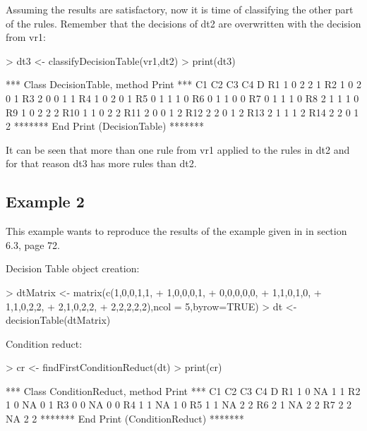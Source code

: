 \documentclass[a4paper]{article}
\begin{document}
Assuming the results are satisfactory, now it is time of classifying the other part of the rules. Remember that the decisions of dt2 are overwritten with the decision from vr1:

\begin{Schunk}
\begin{Sinput}
> dt3 <- classifyDecisionTable(vr1,dt2)
> print(dt3)
\end{Sinput}
\begin{Soutput}
*** Class DecisionTable, method Print *** 
    C1 C2 C3 C4 D
R1  1  0  2  2  1
R2  1  0  2  0  1
R3  2  0  0  1  1
R4  1  0  2  0  1
R5  0  1  1  1  0
R6  0  1  1  0  0
R7  0  1  1  1  0
R8  2  1  1  1  0
R9  1  0  2  2  2
R10 1  1  0  2  2
R11 2  0  0  1  2
R12 2  2  0  1  2
R13 2  1  1  1  2
R14 2  2  0  1  2
******* End Print (DecisionTable) ******* 
\end{Soutput}
\end{Schunk}

It can be seen that more than one rule from vr1 applied to the rules in dt2 and for that reason dt3 has more rules than dt2.



\subsection{Example 2}
This example wants to reproduce the results of the example given in \cite{pawlak} in section 6.3, page 72.

Decision Table object creation:
\begin{Schunk}
\begin{Sinput}
> dtMatrix <- matrix(c(1,0,0,1,1,
+ 1,0,0,0,1,
+ 0,0,0,0,0,
+ 1,1,0,1,0,
+ 1,1,0,2,2,
+ 2,1,0,2,2,
+ 2,2,2,2,2),ncol = 5,byrow=TRUE)
> dt <- decisionTable(dtMatrix)
\end{Sinput}
\end{Schunk}

Condition reduct:
\begin{Schunk}
\begin{Sinput}
> cr <- findFirstConditionReduct(dt)
> print(cr)
\end{Sinput}
\begin{Soutput}
*** Class ConditionReduct, method Print *** 
   C1 C2 C3 C4 D
R1 1  0  NA 1  1
R2 1  0  NA 0  1
R3 0  0  NA 0  0
R4 1  1  NA 1  0
R5 1  1  NA 2  2
R6 2  1  NA 2  2
R7 2  2  NA 2  2
******* End Print (ConditionReduct) ******* 
\end{Soutput}
\end{Schunk}
\end{document}
